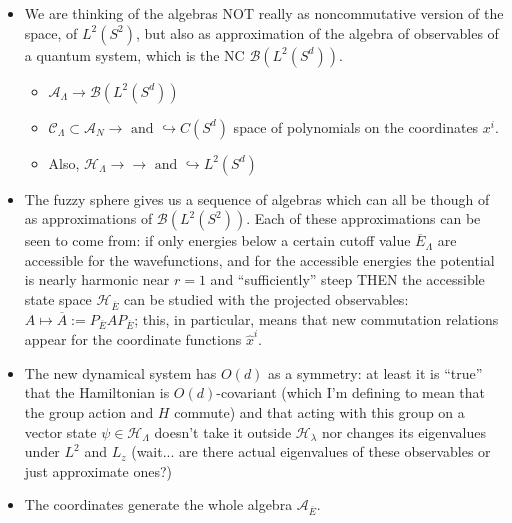 \documentclass{article}
\newcommand{\cut}[1]{\overline{#1}}
\begin{document}
    \begin{itemize}

    \item  We are thinking of the algebras NOT really as noncommutative version of the space, of $L^2(S^2)$, but also as approximation of the algebra of observables of a quantum system, which is the NC $\mathcal B(L^2(S^d))$.
    
        \begin{itemize}
            
        \item $\mathcal A_\Lambda \to \mathcal B(L^2(S^d))$
        
        \item $\mathcal C_\Lambda \subset \mathcal A_N \to \text{ and } \hookrightarrow C(S^d)$ space of polynomials on the coordinates $x^i$.
        
        \item Also, $\mathcal H_\Lambda \to \to \text{ and } \hookrightarrow L^2(S^d)$
            
        \end{itemize}
    
    \item The fuzzy sphere gives us a sequence of algebras which can all be though of as approximations of $\mathcal B(L^2(S^2))$. Each of these approximations can be seen to come from: if only energies below a certain cutoff value $\cut{E}_\Lambda$ are accessible for the wavefunctions, and for the accessible energies the potential is nearly harmonic near $r = 1$ and ``sufficiently'' steep THEN the accessible state space $\mathcal H_{\cut{E}}$ can be studied with the projected observables: $A \mapsto \cut{A} := P_{\overline E} A P_{\overline E}$; this, in particular, means that new commutation relations appear for the coordinate functions $\hat x^i$.
    
    \item The new dynamical system has $O(d)$ as a symmetry: at least it is ``true'' that the Hamiltonian is $O(d)$-covariant (which I'm defining to mean that the group action and $H$ commute) and that acting with this group on a vector state $\psi \in \mathcal H_\Lambda$ doesn't  take it outside $\mathcal H_\lambda$ nor changes its eigenvalues under $L^2$ and $L_z$ (wait... are there actual eigenvalues of these observables or just approximate ones?)
    
    \item The coordinates generate the whole algebra $\mathcal A_{\cut{E}}$.
    

\end{itemize}
\end{document}
